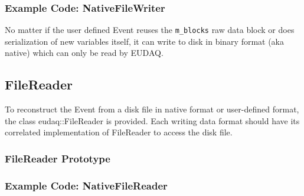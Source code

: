 \subsubsection{Example Code: NativeFileWriter}
No matter if the user defined Event reuses the \lstinline[style=cpp]{m_blocks} raw data block or does serialization of new variables itself, it can write to disk in binary format (aka native) which can only be read by EUDAQ.



\subsection{FileReader}\label{sec:FileReaderWriting}
To reconstruct the Event from a disk file in native format or user-defined format, the class eudaq::FileReader is provided. Each writing data format should have its correlated implementation of FileReader to access the disk file.

\subsubsection{FileReader Prototype}


\subsubsection{Example Code: NativeFileReader}

